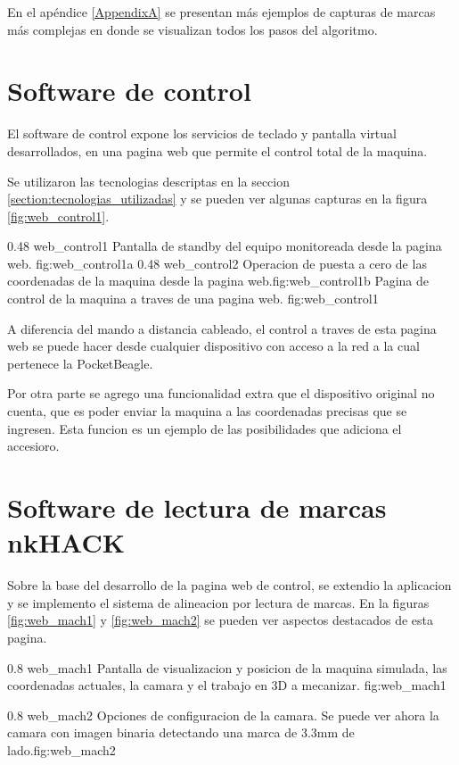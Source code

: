          En el apéndice \ref{AppendixA} se presentan más ejemplos de capturas de marcas más complejas en donde se visualizan todos los pasos del algoritmo.\par

\section{Software de control}

   El software de control expone los servicios de teclado y pantalla virtual desarrollados, en una pagina web que permite el control total de la maquina.\par
   Se utilizaron las tecnologias descriptas en la seccion \ref{section:tecnologias_utilizadas} y se pueden ver algunas capturas en la figura \ref{fig:web_control1}.

\subfigab 
{0.48} {web_control1} {Pantalla de standby del equipo monitoreada desde la pagina web.} {fig:web_control1a}
{0.48} {web_control2} {Operacion de puesta a cero de las coordenadas de la maquina desde la pagina web.}{fig:web_control1b}
      {Pagina de control de la maquina a traves de una pagina web.}
      {fig:web_control1}

   A diferencia del mando a distancia cableado, el control a traves de esta pagina web se puede hacer desde cualquier dispositivo con acceso a la red a la cual pertenece la PocketBeagle.\par
   Por otra parte se agrego una funcionalidad extra que el dispositivo original no cuenta, que es poder enviar la maquina a las coordenadas precisas que se ingresen. Esta funcion es un ejemplo de las posibilidades que adiciona el accesioro.\par

\section{Software de lectura de marcas nkHACK}

Sobre la base del desarrollo de la pagina web de control, se extendio la aplicacion y se implemento el sistema de alineacion por lectura de marcas.
   En la figuras \ref{fig:web_mach1} y \ref{fig:web_mach2} se pueden ver aspectos destacados de esta pagina.

\subfiga
{0.8} {web_mach1} {Pantalla de visualizacion y posicion de la maquina simulada, las coordenadas actuales, la camara y el trabajo en 3D a mecanizar.} {fig:web_mach1}

\subfiga
{0.8} {web_mach2} {Opciones de configuracion de la camara. Se puede ver ahora la camara con imagen binaria detectando una marca de 3.3mm de lado.}{fig:web_mach2}

